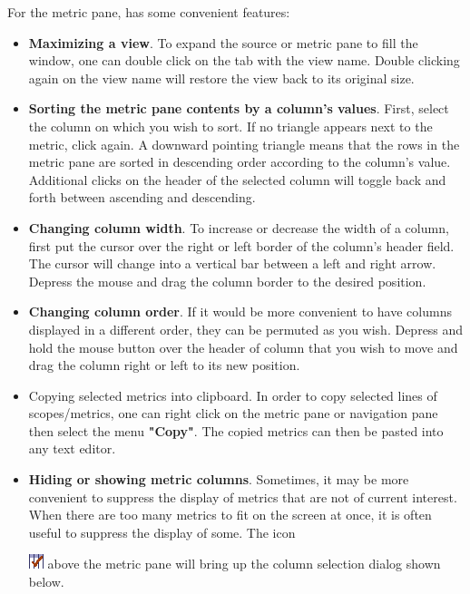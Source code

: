 For the metric pane, \hpcviewer{} has some convenient features:
\begin{itemize}

\item \textbf{Maximizing a view}. To expand the source or metric pane to fill the window, one can double click on the tab with the view name. Double clicking again on the view name will restore the view back to its original size.

\item \textbf{Sorting the metric pane contents by a column's values}. First, select the column on which you wish to sort. If no triangle appears next to the metric, click again. A downward pointing triangle means that the rows in the metric pane are sorted in descending order according to the column's value. Additional clicks on the header of the selected column will toggle back and forth between ascending and descending.

\item \textbf{Changing column width}. To increase or decrease the width of a column, first put the cursor over the right or left border of the column's header field. The cursor will change into a vertical bar between a left and right arrow. Depress the mouse and drag the column border to the desired position.

\item \textbf{Changing column order}. If it would be more convenient to have columns displayed in a different order, they can be permuted as you wish. Depress and hold the mouse button over the header of column that you wish to move and drag the column right or left to its new position.

\item Copying selected metrics into clipboard. In order to copy selected lines of scopes/metrics, one can right click on the metric pane or navigation pane then select the menu \textbf{"Copy"}. The copied metrics can then be pasted into any text editor.

\item \textbf{Hiding or showing metric columns}. Sometimes, it may be more convenient to suppress the display of metrics that are not of current interest. When there are too many metrics to fit on the screen at once, it is often useful to suppress the display of some. The icon

\includegraphics{fig/checkColumns.png} above the metric pane will bring up the column selection dialog shown below.
\end{itemize}

